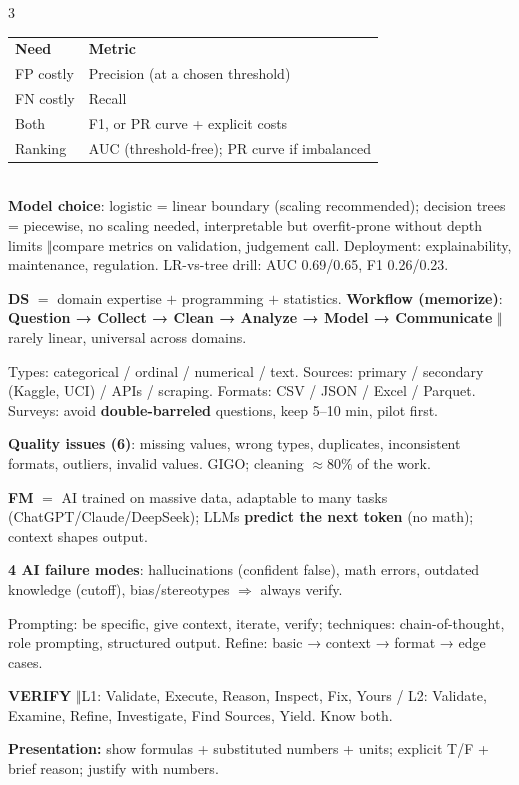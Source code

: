 \documentclass[a4paper,fontsize=8pt]{scrartcl}
\newenvironment{ul}{\begin{list}{\textbullet}{\setlength{\leftmargin}{1.05em}\setlength{\labelwidth}{0.6em}\setlength{\labelsep}{0.35em}\setlength{\itemsep}{0.45pt}\setlength{\parsep}{0pt}\setlength{\topsep}{0.65pt}\setlength{\partopsep}{0pt}}}{\end{list}}
\newcommand{\secB}[1]{\vspace{2.4pt}{\colorbox{hdrB}{\color{white}\bfseries\sffamily\scriptsize\ #1\ }}\par\vspace{1.4pt}}
\newcommand{\sep}{\ensuremath{\boldsymbol{\Vert}}}
\begin{document}
\begin{multicols*}{3}
\begin{ul}
\end{ul}
\footnotesize
\begin{tabular}{@{}p{1.05cm}p{4.85cm}@{}}
\textbf{Need} & \textbf{Metric}\\
FP costly & Precision (at a chosen threshold)\\
FN costly & Recall\\
Both & F1, or PR curve + explicit costs\\
Ranking & AUC (threshold-free); PR curve if imbalanced\\
\end{tabular}\normalsize\\
\textbf{Model choice}: logistic = linear boundary (scaling recommended); decision trees = piecewise, no scaling needed, interpretable but overfit-prone without depth limits \sep compare metrics on validation, judgement call. Deployment: explainability, maintenance, regulation. LR-vs-tree drill: AUC 0.69/0.65, F1 0.26/0.23.

\secB{L1 · DATA SCIENCE + AI BASICS}
\begin{ul}
\item \textbf{DS} $=$ domain expertise $+$ programming $+$ statistics. \textbf{Workflow (memorize)}: \textbf{Question → Collect → Clean → Analyze → Model → Communicate} \sep rarely linear, universal across domains.
\item Types: categorical / ordinal / numerical / text. Sources: primary / secondary (Kaggle, UCI) / APIs / scraping. Formats: CSV / JSON / Excel / Parquet. Surveys: avoid \textbf{double-barreled} questions, keep 5--10 min, pilot first.
\item \textbf{Quality issues (6)}: missing values, wrong types, duplicates, inconsistent formats, outliers, invalid values. GIGO; cleaning $\approx$80\% of the work.
\item \textbf{FM} $=$ AI trained on massive data, adaptable to many tasks (ChatGPT/Claude/DeepSeek); LLMs \textbf{predict the next token} (no math); context shapes output.
\item \textbf{4 AI failure modes}: hallucinations (confident false), math errors, outdated knowledge (cutoff), bias/stereotypes $\Rightarrow$ always verify.
\item Prompting: be specific, give context, iterate, verify; techniques: chain-of-thought, role prompting, structured output. Refine: basic → context → format → edge cases.
\item \textbf{VERIFY} \sep L1: Validate, Execute, Reason, Inspect, Fix, Yours / L2: Validate, Examine, Refine, Investigate, Find Sources, Yield. Know both.
\end{ul}

\textbf{Presentation:} show formulas + substituted numbers + units; explicit T/F + brief reason; justify with numbers.

\end{multicols*}
\end{document}
